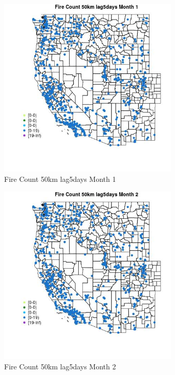 \begin{figure} 
\centering  
\includegraphics[width=0.77\textwidth]{Code_Outputs/Report_ML_input_PM25_Step4_part_e_de_duplicated_aves_compiled_2019-05-21wNAs_MapObsMo1Fire_Count_50km_lag5days.jpg} 
\caption{\label{fig:Report_ML_input_PM25_Step4_part_e_de_duplicated_aves_compiled_2019-05-21wNAsMapObsMo1Fire_Count_50km_lag5days}Fire Count 50km lag5days Month 1} 
\end{figure} 
 

\begin{figure} 
\centering  
\includegraphics[width=0.77\textwidth]{Code_Outputs/Report_ML_input_PM25_Step4_part_e_de_duplicated_aves_compiled_2019-05-21wNAs_MapObsMo2Fire_Count_50km_lag5days.jpg} 
\caption{\label{fig:Report_ML_input_PM25_Step4_part_e_de_duplicated_aves_compiled_2019-05-21wNAsMapObsMo2Fire_Count_50km_lag5days}Fire Count 50km lag5days Month 2} 
\end{figure} 
 

